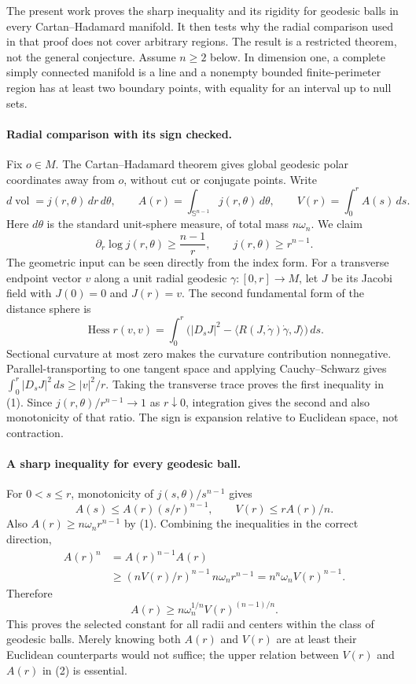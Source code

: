 \documentclass[11pt]{article}
\begin{document}
The present work proves the sharp inequality and its rigidity for
geodesic balls in every Cartan--Hadamard manifold. It then tests why the
radial comparison used in that proof does not cover arbitrary regions.
The result is a restricted theorem, not the general conjecture.
Assume $n\ge2$ below. In dimension one, a complete simply connected
manifold is a line and a nonempty bounded finite-perimeter region has
at least two boundary points, with equality for an interval up to null sets.

\paragraph{Radial comparison with its sign checked.}
Fix $o\in M$. The Cartan--Hadamard theorem gives global geodesic polar
coordinates away from $o$, without cut or conjugate points. Write
\[
 d\operatorname{vol}=j(r,\theta)\,dr\,d\theta,
 \qquad A(r)=\int_{\mathbb S^{n-1}}j(r,\theta)\,d\theta,
 \qquad V(r)=\int_0^r A(s)\,ds.
\]
Here $d\theta$ is the standard unit-sphere measure, of total mass
$n\omega_n$. We claim
\[
 \partial_r\log j(r,\theta)\ge\frac{n-1}{r},
 \qquad j(r,\theta)\ge r^{n-1}.                         \tag{1}
\]
The geometric input can be seen directly from the index form.
For a transverse endpoint vector $v$ along a unit radial geodesic
$\gamma:[0,r]\to M$, let $J$ be its Jacobi field with $J(0)=0$
and $J(r)=v$. The second fundamental form of the distance sphere is
\[
 \operatorname{Hess}r(v,v)=
 \int_0^r\bigl(|D_sJ|^2-
       \langle R(J,\dot\gamma)\dot\gamma,J\rangle\bigr)\,ds.
\]
Sectional curvature at most zero makes the curvature contribution
nonnegative. Parallel-transporting to one tangent space and applying
Cauchy--Schwarz gives $\int_0^r|D_sJ|^2\,ds\ge|v|^2/r$.
Taking the transverse trace proves the first inequality in (1).
Since $j(r,\theta)/r^{n-1}\to1$ as $r\downarrow0$, integration gives
the second and also monotonicity of that ratio.
The sign is expansion relative to Euclidean space, not contraction.

\paragraph{A sharp inequality for every geodesic ball.}
For $0<s\le r$, monotonicity of $j(s,\theta)/s^{n-1}$ gives
\[
             A(s)\le A(r)(s/r)^{n-1},\qquad
             V(r)\le rA(r)/n.                           \tag{2}
\]
Also $A(r)\ge n\omega_n r^{n-1}$ by (1).
Combining the inequalities in the correct direction,
\[
 \begin{split}
 A(r)^n
 &=A(r)^{n-1}A(r)\\
 &\ge (nV(r)/r)^{n-1}\,n\omega_n r^{n-1}
   =n^n\omega_n V(r)^{n-1}.
 \end{split}
\]
Therefore
\[
                     A(r)\ge n\omega_n^{1/n}V(r)^{(n-1)/n}.
                                                               \tag{3}
\]
This proves the selected constant for all radii and centers within
the class of geodesic balls. Merely knowing both $A(r)$ and $V(r)$
are at least their Euclidean counterparts would not suffice;
the upper relation between $V(r)$ and $A(r)$ in (2) is essential.
\end{document}

